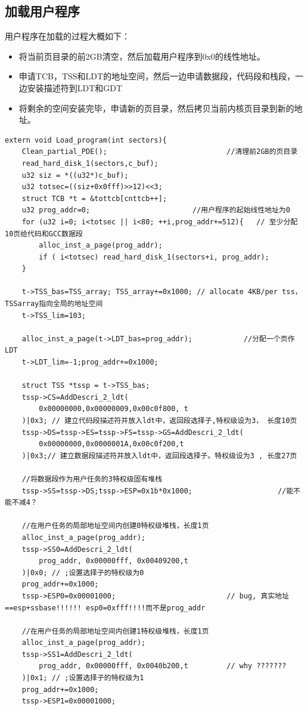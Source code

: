 \documentclass[a4paper,11pt,UTF8]{ctexart}
\begin{document}
	\subsection{加载用户程序}
	用户程序在加载的过程大概如下：
	\begin{itemize}
		\item 将当前页目录的前2GB清空，然后加载用户程序到0x0的线性地址。
		\item 申请TCB，TSS和LDT的地址空间，然后一边申请数据段，代码段和栈段，一边安装描述符到LDT和GDT
		\item 将剩余的空间安装完毕，申请新的页目录，然后拷贝当前内核页目录到新的地址。
	\end{itemize}
	\begin{lstlisting}[language={[ANSI]C},keywordstyle=\color{blue!70},commentstyle=\color{red!50!green!50!blue!50},frame=shadowbox, rulesepcolor=\color{red!20!green!20!blue!20}]
extern void Load_program(int sectors){
	Clean_partial_PDE();							//清理前2GB的页目录
	read_hard_disk_1(sectors,c_buf);
	u32 siz = *((u32*)c_buf); 
	u32 totsec=((siz+0x0fff)>>12)<<3;
	struct TCB *t = &tottcb[cnttcb++];
	u32 prog_addr=0;  						//用户程序的起始线性地址为0
	for (u32 i=0; i<totsec || i<80; ++i,prog_addr+=512){   // 至少分配10页给代码和GCC数据段
		alloc_inst_a_page(prog_addr);
		if ( i<totsec) read_hard_disk_1(sectors+i, prog_addr);
	}

	t->TSS_bas=TSS_array; TSS_array+=0x1000; // allocate 4KB/per tss，TSSarray指向全局的地址空间
	t->TSS_lim=103;

	alloc_inst_a_page(t->LDT_bas=prog_addr);			//分配一个页作LDT
	t->LDT_lim=-1;prog_addr+=0x1000;

	struct TSS *tssp = t->TSS_bas;
	tssp->CS=AddDescri_2_ldt(
		0x00000000,0x00000009,0x00c0f800, t
	)|0x3; // 建立代码段描述符并放入ldt中，返回段选择子,特权级设为3， 长度10页
	tssp->DS=tssp->ES=tssp->FS=tssp->GS=AddDescri_2_ldt(
		0x00000000,0x0000001A,0x00c0f200,t
	)|0x3;// 建立数据段描述符并放入ldt中，返回段选择子。特权级设为3 , 长度27页

	//将数据段作为用户任务的3特权级固有堆栈
	tssp->SS=tssp->DS;tssp->ESP=0x1b*0x1000;					//能不能不减4？
	
	//在用户任务的局部地址空间内创建0特权级堆栈，长度1页
	alloc_inst_a_page(prog_addr);
	tssp->SS0=AddDescri_2_ldt(
		prog_addr, 0x00000fff, 0x00409200,t					
	)|0x0; // ;设置选择子的特权级为0
	prog_addr+=0x1000;
	tssp->ESP0=0x00001000;							// bug, 真实地址==esp+ssbase!!!!!! esp0=0xfff!!!!而不是prog_addr

	//在用户任务的局部地址空间内创建1特权级堆栈，长度1页
	alloc_inst_a_page(prog_addr);
	tssp->SS1=AddDescri_2_ldt(
		prog_addr, 0x00000fff, 0x0040b200,t			// why ???????
	)|0x1; // ;设置选择子的特权级为1
	prog_addr+=0x1000;
	tssp->ESP1=0x00001000;


\end{lstlisting}
\end{document}
